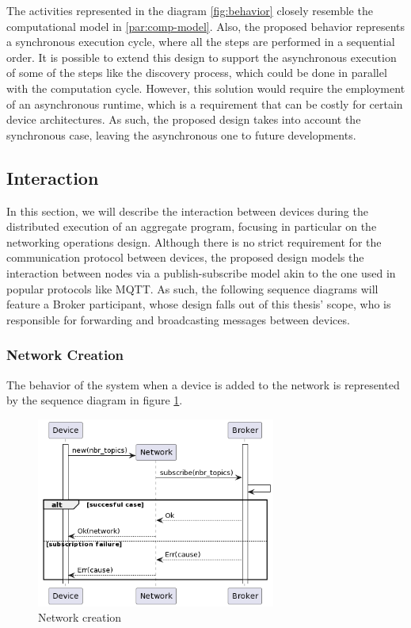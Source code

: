 The activities represented in the diagram \ref{fig:behavior} closely resemble the computational model in \ref{par:comp-model}.
Also, the proposed behavior represents a synchronous execution cycle, where all the steps are performed in a sequential order. It is possible to extend this design
to support the asynchronous execution of some of the steps like the discovery process, which could be done in parallel with the computation cycle. However, this solution would require the employment of an asynchronous runtime, which is a requirement that can be costly for certain device architectures. As such, the proposed design
takes into account the synchronous case, leaving the asynchronous one to future developments.

\subsection{Interaction}
\label{subsec:interaction}

In this section, we will describe the interaction between devices during the distributed execution of an aggregate program, focusing in particular on the networking operations design.
Although there is no strict requirement for the communication protocol between devices, the proposed design models the interaction between nodes via a publish-subscribe model akin to the one used in popular protocols like MQTT.
As such, the following sequence diagrams will feature a Broker participant, whose design falls out of this thesis' scope, who is responsible for forwarding and broadcasting messages between devices.

\subsubsection{Network Creation}
The behavior of the system when a device is added to the network is represented by the sequence diagram in figure \ref{fig:network-creation}.

\begin{figure}[ht!]
    \centering
    \includegraphics[width=0.7\textwidth]{figures/diagrams/img/activity-network-creation.png}
    \caption{Network creation}
    \label{fig:network-creation}
\end{figure}

